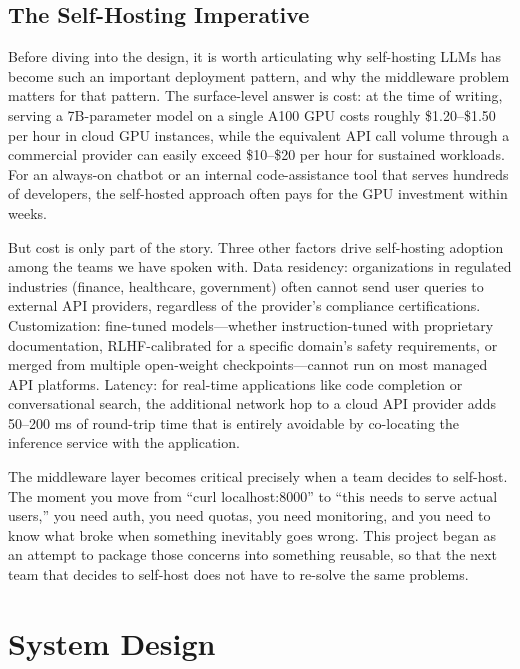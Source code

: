 \documentclass[10pt,journal]{IEEEtran}
\begin{document}
\subsection{The Self-Hosting Imperative}

Before diving into the design, it is worth articulating why self-hosting LLMs has become such an important deployment pattern, and why the middleware problem matters for that pattern. The surface-level answer is cost: at the time of writing, serving a 7B-parameter model on a single A100 GPU costs roughly \$1.20--\$1.50 per hour in cloud GPU instances, while the equivalent API call volume through a commercial provider can easily exceed \$10--\$20 per hour for sustained workloads. For an always-on chatbot or an internal code-assistance tool that serves hundreds of developers, the self-hosted approach often pays for the GPU investment within weeks.

But cost is only part of the story. Three other factors drive self-hosting adoption among the teams we have spoken with. Data residency: organizations in regulated industries (finance, healthcare, government) often cannot send user queries to external API providers, regardless of the provider's compliance certifications. Customization: fine-tuned models---whether instruction-tuned with proprietary documentation, RLHF-calibrated for a specific domain's safety requirements, or merged from multiple open-weight checkpoints---cannot run on most managed API platforms. Latency: for real-time applications like code completion or conversational search, the additional network hop to a cloud API provider adds 50--200 ms of round-trip time that is entirely avoidable by co-locating the inference service with the application.

The middleware layer becomes critical precisely when a team decides to self-host. The moment you move from ``curl localhost:8000'' to ``this needs to serve actual users,'' you need auth, you need quotas, you need monitoring, and you need to know what broke when something inevitably goes wrong. This project began as an attempt to package those concerns into something reusable, so that the next team that decides to self-host does not have to re-solve the same problems.

\section{System Design}\label{sec:design}
\end{document}

